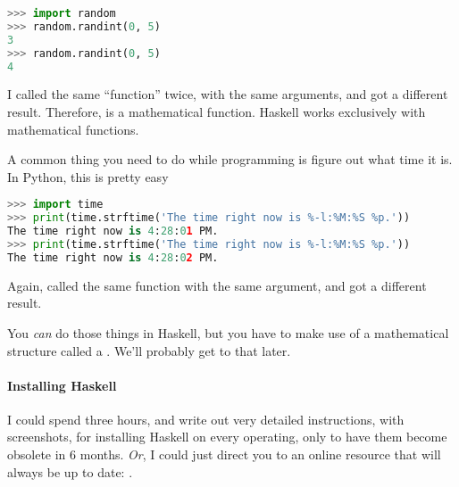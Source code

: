 \begin{lstlisting}[language={Python}]
>>> import random
>>> random.randint(0, 5)
3
>>> random.randint(0, 5)
4
\end{lstlisting}

I called the same ``function'' twice, with the same arguments, and got
a different result. Therefore,  is 
a mathematical function. Haskell works exclusively with mathematical
functions.


A common thing you need to do while programming is figure out what
time it is. In Python, this is pretty easy

\begin{lstlisting}[language=Python]
>>> import time
>>> print(time.strftime('The time right now is %-l:%M:%S %p.'))
The time right now is 4:28:01 PM.
>>> print(time.strftime('The time right now is %-l:%M:%S %p.'))
The time right now is 4:28:02 PM.
\end{lstlisting}

Again, called the same function with the same argument, and got a
different result.


You \emph{can} do those things in Haskell, but you have to make use of
a mathematical structure called a . We'll probably get to
that later.

\paragraph{Installing Haskell} I could spend three hours, and write
out very detailed instructions, with screenshots, for installing
Haskell on every operating, only to have them become obsolete in 6
months. \emph{Or}, I could just direct you to an online resource that
will always be up to date:
.


